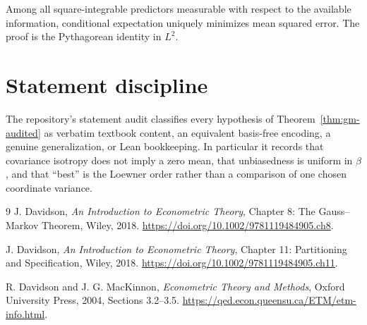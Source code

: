 \begin{theorem}\label{thm:conditional-prediction}
Among all square-integrable predictors measurable with respect to the available information,
conditional expectation uniquely minimizes mean squared error.  The proof is the Pythagorean
identity in $L^2$.
\leanok
\end{theorem}

\chapter{Statement discipline}

The repository's statement audit classifies every hypothesis of Theorem~\ref{thm:gm-audited} as
verbatim textbook content, an equivalent basis-free encoding, a genuine generalization, or Lean
bookkeeping.  In particular it records that covariance isotropy does not imply a zero mean, that
unbiasedness is uniform in $\beta$, and that ``best'' is the Loewner order rather than a comparison
of one chosen coordinate variance.

\begin{thebibliography}{9}
J. Davidson, \emph{An Introduction to Econometric Theory}, Chapter 8: The Gauss--Markov Theorem,
Wiley, 2018. \url{https://doi.org/10.1002/9781119484905.ch8}.

J. Davidson, \emph{An Introduction to Econometric Theory}, Chapter 11: Partitioning and
Specification, Wiley, 2018. \url{https://doi.org/10.1002/9781119484905.ch11}.

R. Davidson and J. G. MacKinnon, \emph{Econometric Theory and Methods}, Oxford University Press,
2004, Sections 3.2--3.5. \url{https://qed.econ.queensu.ca/ETM/etm-info.html}.
\end{thebibliography}
